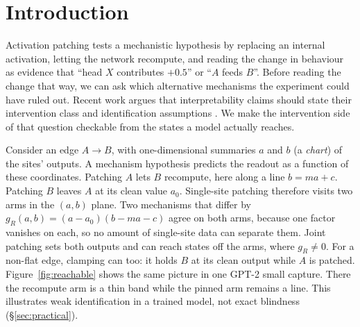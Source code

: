 \documentclass{article}
\theoremstyle{plain}
\theoremstyle{definition}
\begin{document}
\begingroup\let\thefootnote\relax{}\endgroup

\section{Introduction}
\label{sec:intro}

Activation patching tests a mechanistic hypothesis by replacing an internal activation, letting the network
recompute, and reading the change in behaviour as evidence that ``head $X$ contributes $+0.5$'' or ``$A$ feeds
$B$''. Before reading the change that way, we can ask which alternative mechanisms the experiment could have ruled
out. Recent work argues that interpretability claims should state their intervention class and identification
assumptions \citep{joshi2026causality,lin2026disclose}. We make the intervention side of that question checkable
from the states a model actually reaches.

Consider an edge $A\to B$, with one-dimensional summaries $a$ and $b$ (a \emph{chart}) of the sites' outputs.
A mechanism hypothesis predicts the readout as a function of these coordinates. Patching $A$ lets $B$ recompute, here along a line $b=ma+c$. Patching $B$
leaves $A$ at its clean value $a_0$. Single-site patching therefore visits two arms in the $(a,b)$ plane. Two
mechanisms that differ by $g_R(a,b)=(a-a_0)(b-ma-c)$ agree on both arms, because one factor vanishes on each, so no
amount of single-site data can separate them. Joint patching sets both outputs and can reach states off the arms, where $g_R\neq0$.
For a non-flat edge, clamping can too: it holds $B$ at its clean output while $A$ is patched. Figure~\ref{fig:reachable}
shows the same picture in one GPT-2 small capture. There the recompute arm is a thin band while the pinned arm remains a line. This illustrates weak
identification in a trained model, not exact blindness (\S\ref{sec:practical}).
\end{document}
